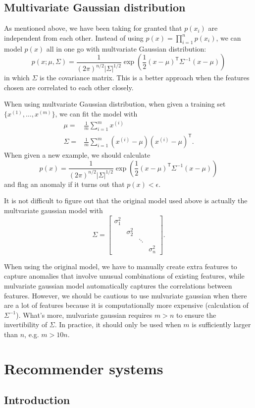 \subsection{Multivariate Gaussian distribution}
As mentioned above, we have been taking for granted that $p(x_i)$ are independent from each other. Instead of using $p(x) = \prod\limits_{i=1}^{n}p(x_i)$, we can model $p(x)$ all in one go with multvariate Gaussian distribution:
\begin{equation}
p(x;\mu,\Sigma) = \frac{1}{(2\pi)^{n/2}\left\lvert\Sigma\right\rvert^{1/2}}\exp\left(\frac{1}{2}(x-\mu)^{\mathsf T}\Sigma^{-1}(x-\mu)\right)
\end{equation}
in which $\Sigma$ is the covariance matrix. This is a better approach when the features chosen are correlated to each other closely. 

When using multvariate Gaussian distribution, when given a training set $\{x^{(1)},\dots,x^{(m)}\}$, we can fit the model with 
\begin{equation}
\begin{split}
\mu=&\frac{1}{m}\sum\limits_{i=1}^mx^{(i)}\\
\Sigma=&\frac{1}{m}\sum\limits_{i=1}^m(x^{(i)}-\mu)(x^{(i)}-\mu)^{\mathsf T}.
\end{split}
\end{equation}
When given a new example, we should calculate
\begin{equation*}
p(x) = \frac{1}{(2\pi)^{n/2}\left\lvert\Sigma\right\rvert^{1/2}}\exp\left(\frac{1}{2}(x-\mu)^{\mathsf T}\Sigma^{-1}(x-\mu)\right)
\end{equation*}
and flag an anomaly if it turns out that $p(x) < \epsilon$.

It is not difficult to figure out that the original model used above is actually the multvariate gaussian model with 
\begin{equation}
\Sigma = \begin{bmatrix}
\sigma_1^2\\
&\sigma_2^2\\
&&\ddots\\
&&&\sigma_n^2
\end{bmatrix}.
\end{equation}

When using the original model, we have to manually create extra features to capture anomalies that involve unusual combinations of existing features, while mulvariate gaussian model automatically captures the correlations between features. However, we should be cautious to use mulvariate gaussian when there are a lot of features because it is computationally more expensive (calculation of $\Sigma^{-1}$). What's more, mulvariate gaussian requires $m>n$ to ensure the invertibility of $\Sigma$. In practice, it should only be used when $m$ is sufficiently larger than $n$, e.g. $m>10n$.
\section{Recommender systems}
\subsection{Introduction}

\ifx\PREAMBLE\undefined

\fi